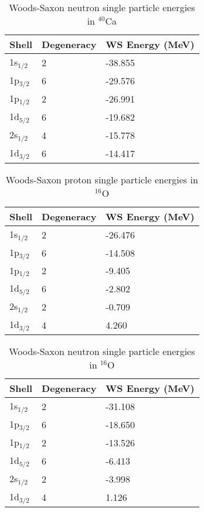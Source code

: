 \begin{table}
\centering
\caption{Woods-Saxon neutron single particle energies in $^\text{40}$Ca}
\begin{tabular}{@{}lll@{}}
\toprule
Shell         & Degeneracy & WS Energy (MeV) \\ \midrule
1s$_{1/2}$    & 2          & -38.855         \\
1p$_{3/2}$    & 6          & -29.576         \\
1p$_{1/2}$    & 2          & -26.991         \\
1d$_{5/2}$    & 6          & -19.682         \\
2s$_{1/2}$    & 4          & -15.778         \\
1d$_{3/2}$    & 6          & -14.417         \\
\bottomrule
\end{tabular}
\end{table}

\begin{table}[h!]
\centering
\caption{Woods-Saxon proton single particle energies in $^\text{16}$O}
\begin{tabular}{@{}lll@{}}
\toprule
Shell         & Degeneracy & WS Energy (MeV) \\ \midrule
1s$_{1/2}$    & 2          & -26.476         \\
1p$_{3/2}$    & 6          & -14.508         \\
1p$_{1/2}$    & 2          & -9.405         \\
1d$_{5/2}$    & 6          & -2.802         \\
2s$_{1/2}$    & 2          & -0.709         \\
1d$_{3/2}$    & 4          & 4.260         \\
\bottomrule
\end{tabular}
\end{table}
\begin{table}[h!]
\centering
\caption{Woods-Saxon neutron single particle energies in $^\text{16}$O}
\begin{tabular}{@{}lll@{}}
\toprule
Shell         & Degeneracy & WS Energy (MeV) \\ \midrule
1s$_{1/2}$    & 2          & -31.108         \\
1p$_{3/2}$    & 6          & -18.650         \\
1p$_{1/2}$    & 2          & -13.526         \\
1d$_{5/2}$    & 6          & -6.413         \\
2s$_{1/2}$    & 2          & -3.998         \\
1d$_{3/2}$    & 4          & 1.126         \\
\bottomrule
\end{tabular}
\end{table}